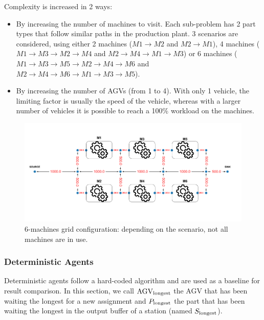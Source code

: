 \documentclass[sn-mathphys]{sn-jnl}
\begin{document}
Complexity is increased in 2 ways:
\begin{itemize}
    \item By increasing the number of machines to visit. Each sub-problem has 2 part types that follow similar paths in the production plant. 3 scenarios are considered, using either 2 machines ($M1 \rightarrow M2$ and $M2 \rightarrow M1$), 4 machines ($M1 \rightarrow M3 \rightarrow M2 \rightarrow M4$ and $M2 \rightarrow M4 \rightarrow M1 \rightarrow M3$) or 6 machines ($M1 \rightarrow M3 \rightarrow M5 \rightarrow M2 \rightarrow M4 \rightarrow M6$ and $M2 \rightarrow M4 \rightarrow M6 \rightarrow M1 \rightarrow M3 \rightarrow M5$).
    \item By increasing the number of AGVs (from 1 to 4). With only 1 vehicle, the limiting factor is usually the speed of the vehicle, whereas with a larger number of vehicles it is possible to reach a 100\% workload on the machines.
\end{itemize}

\begin{figure}[ht]
  \includegraphics[width=1.0\textwidth]{plan_grid_6_machines.png}
  \caption{6-machines grid configuration: depending on the scenario, not all machines are in use.}
  \label{fig:plan_grid_6_machines}
\end{figure}

\subsubsection{Deterministic Agents}

Deterministic agents follow a hard-coded algorithm and are used as a baseline for result comparison. In this section, we call $\text{AGV}_{\rm longest}$ the AGV that has been waiting the longest for a new assignment and $P_{\rm longest}$ the part that has been waiting the longest in the output buffer of a station (named $S_{\rm longest}$).
\end{document}
